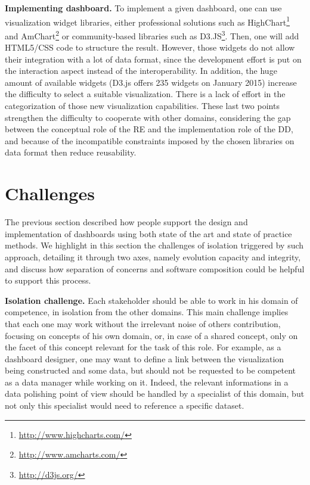 \documentclass{acm_proc_article-sp}
\begin{document}
\textbf{Implementing dashboard.}
To implement a given dashboard, one can use visualization widget
libraries, either professional solutions such as
HighChart\footnote{\url{http://www.highcharts.com/}} and
AmChart\footnote{\url{http://www.amcharts.com/}} or com\-munity-based
libraries such as D3.JS\footnote{\url{http://d3js.org/}}. Then, one
will add HTML5/CSS code to structure the result.
However, those widgets do not allow their integration with a lot of
data format, since the development effort is put on the interaction
aspect instead of the interoperability. In addition, the huge amount
of available widgets (\eg D3.js offers 235 widgets on January 2015)
increase the difficulty to select a suitable visualization. There is 
a lack of effort in the categorization of those new visualization
capabilities\cite{ecmfa}.  These last two points strengthen the
difficulty to cooperate with other domains, considering the gap
between the conceptual role of the RE and the implementation role of
the DD, and because of the incompatible constraints imposed by the chosen
libraries on data format then reduce reusability.

\section{Challenges}

The previous section described how people support the design and
implementation of dashboards using both state of the art and state of
practice methods. We highlight in this section the challenges of isolation
triggered by such approach, detailing it through two axes, namely evolution
capacity and integrity, and discuss how separation of concerns and
software composition could be helpful to support this process.


\textbf{Isolation challenge.}
Each stakeholder should be able to work in his domain of competence,
in isolation from the other domains. This main challenge implies that
each one may work without the irrelevant noise of others contribution,
focusing on concepts of his own domain, or, in case of a shared concept,
only on the facet of this concept relevant for the task of this role.
For example, as a dashboard designer, one may want to define a link
between the visualization being constructed and some data, but should
not be requested to be competent as a data manager while working on it.
Indeed, the relevant informations in a data polishing point of view should
be handled by a specialist of this domain, but not only this specialist
would need to reference a specific dataset.
\end{document}
